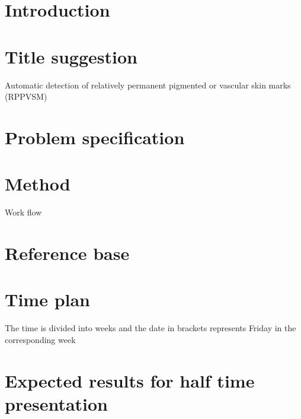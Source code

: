 \documentclass{article}
\begin{document}
\setcounter{page}{1}


\section{Introduction}

\section{Title suggestion}

Automatic detection of relatively permanent pigmented or vascular skin marks (RPPVSM)
\section{Problem specification}

\section{Method}

Work flow 


\section{Reference base}

\section{Time plan}
The time is divided into weeks and the date in brackets represents Friday in the corresponding week 


\section{Expected results for half time presentation}




\end{document}
